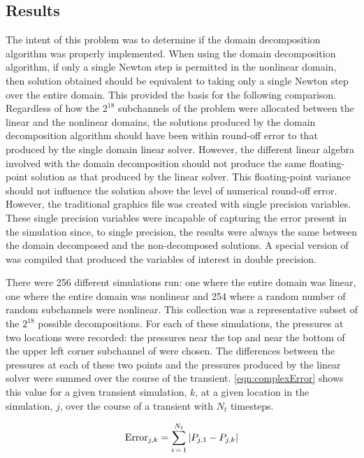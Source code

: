 \subsection{Results}
\label{sect:complexResults}

The intent of this problem was to determine if the domain decomposition algorithm was properly implemented.
When using the domain decomposition algorithm, if only a single Newton step is permitted in the nonlinear domain, then solution obtained should be equivalent to taking only a single Newton step over the entire domain.
This provided the basis for the following comparison.
Regardless of how the $2^{18}$ subchannels of the problem were allocated between the linear and the nonlinear domains, the solutions produced by the domain decomposition algorithm should have been within round-off error to that produced by the single domain linear solver.
However, the different linear algebra involved with the domain decomposition should not produce the same floating-point solution as that produced by the linear solver.
This floating-point variance should not influence the solution above the level of numerical round-off error.
However, the traditional \cobra{} graphics file was created with single precision variables.
These single precision variables were incapable of capturing the error present in the simulation since, to single precision, the results were always the same between the domain decomposed and the non-decomposed solutions.
A special version of \cobra{} was compiled that produced the variables of interest in double precision.

There were 256 different simulations run: one where the entire domain was linear, one where the entire domain was nonlinear and 254 where a random number of random subchannels were nonlinear.
This collection was a representative subset of the $2^{18}$ possible decompositions.
For each of these simulations, the pressures at two locations were recorded: the pressures near the top and near the bottom of the upper left corner subchannel of  were chosen.
The differences between the pressures at each of these two points and the pressures produced by the linear solver were summed over the course of the transient.
\eqref{eqn:complexError} shows this value for a given transient simulation, $k$, at a given location in the simulation, $j$, over the course of a transient with $N_{t}$ timesteps.

\begin{equation}
\label{eqn:complexError}
\text{Error}_{j, k} = \sum_{i\,=\,1}^{N_{t}} \left|P_{j,1} -P_{j, k}\right|
\end{equation}

